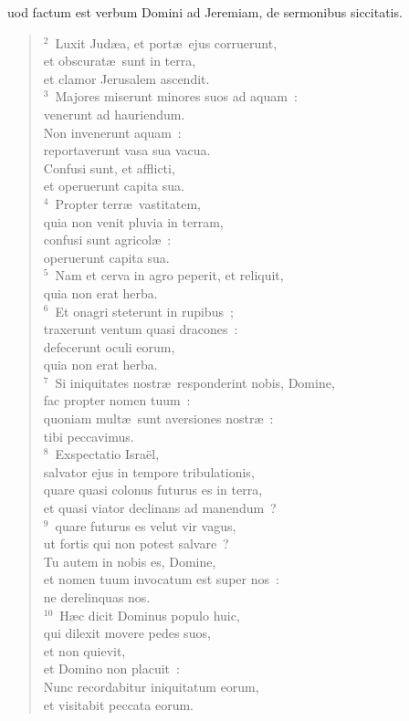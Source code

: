 \bchapter
{}uod factum est verbum Domini ad Jeremiam, de sermonibus siccitatis.
\begin{verse}${}^{2}$~Luxit Jud\ae a, et port\ae\ ejus corruerunt,\\ et obscurat\ae\ sunt in terra,\\ et clamor Jerusalem ascendit.\\
${}^{3}$~Majores miserunt minores suos ad aquam~:\\ venerunt ad hauriendum.\\ Non invenerunt aquam~:\\ reportaverunt vasa sua vacua.\\ Confusi sunt, et afflicti,\\ et operuerunt capita sua.\\
${}^{4}$~Propter terr\ae\ vastitatem,\\ quia non venit pluvia in terram,\\ confusi sunt agricol\ae~:\\ operuerunt capita sua.\\
${}^{5}$~Nam et cerva in agro peperit, et reliquit,\\ quia non erat herba.\\
${}^{6}$~Et onagri steterunt in rupibus~;\\ traxerunt ventum quasi dracones~:\\ defecerunt oculi eorum,\\ quia non erat herba.\\
${}^{7}$~Si iniquitates nostr\ae\ responderint nobis, Domine,\\ fac propter nomen tuum~:\\ quoniam mult\ae\ sunt aversiones nostr\ae~:\\ tibi peccavimus.\\
${}^{8}$~Exspectatio Isra\"el,\\ salvator ejus in tempore tribulationis,\\ quare quasi colonus futurus es in terra,\\ et quasi viator declinans ad manendum~?\\
${}^{9}$~quare futurus es velut vir vagus,\\ ut fortis qui non potest salvare~?\\ Tu autem in nobis es, Domine,\\ et nomen tuum invocatum est super nos~:\\ ne derelinquas nos.\\
${}^{10}$~H\ae c dicit Dominus populo huic,\\ qui dilexit movere pedes suos,\\ et non quievit,\\ et Domino non placuit~:\\ Nunc recordabitur iniquitatum eorum,\\ et visitabit peccata eorum.\\

\end{verse}
